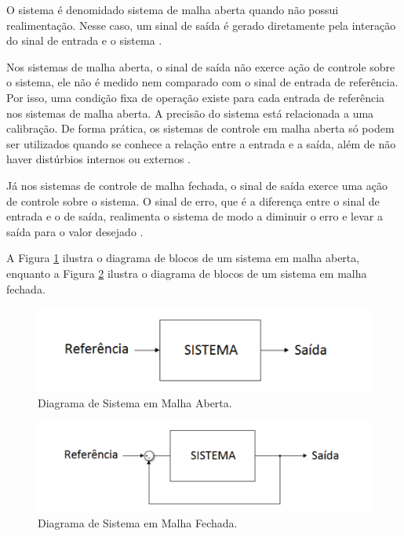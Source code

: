 \documentclass[journal,brazil,english]{IEEEtran}
\begin{document}
O sistema é denomidado sistema de malha aberta quando não possui realimentação. Nesse caso, um sinal de saída é gerado diretamente pela interação do sinal de entrada e o sistema \cite{franklin}.

Nos sistemas de malha aberta, o sinal de saída não exerce ação de controle sobre o sistema, ele não é medido nem comparado com o sinal de entrada de referência. Por isso, uma condição fixa de operação existe para cada entrada de referência nos sistemas de malha aberta. A precisão do sistema está relacionada a uma calibração. De forma prática, os sistemas de controle em malha aberta  só podem ser utilizados quando se conhece a relação entre a entrada e a saída, além de não haver distúrbios internos ou externos \cite{ogata}.

Já nos sistemas de controle de malha fechada, o sinal de saída exerce uma ação de controle sobre o sistema. O sinal de erro, que é a diferença entre o sinal de entrada e o de saída, realimenta o sistema de modo a diminuir o erro e levar a saída para o valor desejado \cite{ogata}.

A Figura \ref{malhaaberta} ilustra o diagrama de blocos de um sistema em malha aberta, enquanto a Figura \ref{malhafechada} ilustra o diagrama de blocos de um sistema em malha fechada.
 
\begin{figure}[H]
	\centering
	\includegraphics[width=\columnwidth]{./imagens/malha_aberta.pdf}
    \renewcommand{\figurename}{Fig.}
    \caption{Diagrama de Sistema em Malha Aberta.}
	\label{malhaaberta}
\end{figure}

\begin{figure}[H]
	\centering
	\includegraphics[width=\columnwidth]{./imagens/malha_fechada.pdf}
    \renewcommand{\figurename}{Fig.}
    \caption{Diagrama de Sistema em Malha Fechada.}
	\label{malhafechada}
\end{figure}
\end{document}
